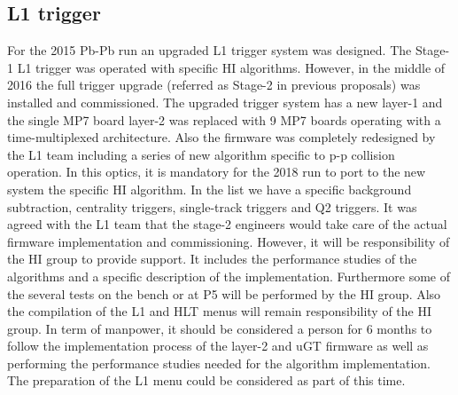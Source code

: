 \subsection{L1 trigger\label{subsec:L1Trigger}}
For the 2015 Pb-Pb run an upgraded L1 trigger system was designed. The Stage-1 L1 trigger was operated with specific HI
algorithms. However, in the middle of 2016 the full trigger upgrade (referred as Stage-2 in previous proposals) was
installed and commissioned. The upgraded trigger system has a new layer-1 and the single MP7 board layer-2 was replaced
with 9 MP7 boards operating with a time-multiplexed architecture. Also the firmware was completely redesigned by the L1
team including a series of new algorithm specific to p-p collision operation. In this optics, it is mandatory for the
2018 run to port to the new system the specific HI algorithm. In the list we have a specific background subtraction,
centrality triggers, single-track triggers and Q2 triggers. It was agreed with the L1 team that the stage-2 engineers
would take care of the actual firmware implementation and commissioning. However, it will be responsibility of the HI
group to provide support. It includes the performance studies of the algorithms and a specific description of the
implementation. Furthermore some of the several tests on the bench or at P5 will be performed by the HI group. Also the
compilation of the L1 and HLT menus will remain responsibility of the HI group. In term of manpower, it should be
considered a person for 6 months to follow the implementation process of the layer-2 and uGT firmware as well as
performing the performance studies needed for the algorithm implementation. The preparation of the L1 menu could be
considered as part of this time. 
